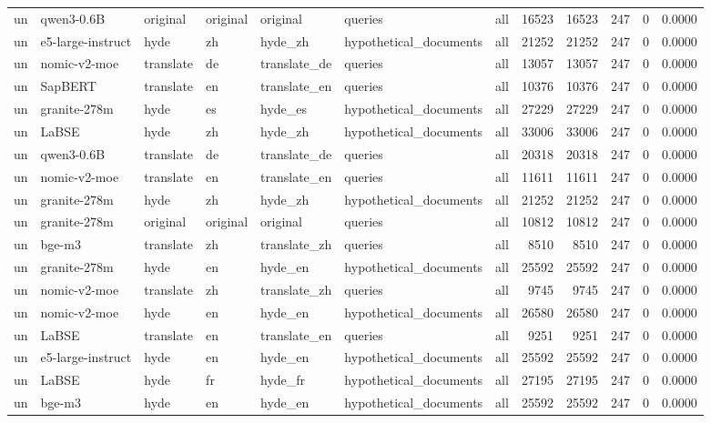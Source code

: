 \begin{tabular}{lllllllrrrrr}
un & qwen3-0.6B & original & original & original & queries & all & 16523 & 16523 & 247 & 0 & 0.0000 \\
un & e5-large-instruct & hyde & zh & hyde\_zh & hypothetical\_documents & all & 21252 & 21252 & 247 & 0 & 0.0000 \\
un & nomic-v2-moe & translate & de & translate\_de & queries & all & 13057 & 13057 & 247 & 0 & 0.0000 \\
un & SapBERT & translate & en & translate\_en & queries & all & 10376 & 10376 & 247 & 0 & 0.0000 \\
un & granite-278m & hyde & es & hyde\_es & hypothetical\_documents & all & 27229 & 27229 & 247 & 0 & 0.0000 \\
un & LaBSE & hyde & zh & hyde\_zh & hypothetical\_documents & all & 33006 & 33006 & 247 & 0 & 0.0000 \\
un & qwen3-0.6B & translate & de & translate\_de & queries & all & 20318 & 20318 & 247 & 0 & 0.0000 \\
un & nomic-v2-moe & translate & en & translate\_en & queries & all & 11611 & 11611 & 247 & 0 & 0.0000 \\
un & granite-278m & hyde & zh & hyde\_zh & hypothetical\_documents & all & 21252 & 21252 & 247 & 0 & 0.0000 \\
un & granite-278m & original & original & original & queries & all & 10812 & 10812 & 247 & 0 & 0.0000 \\
un & bge-m3 & translate & zh & translate\_zh & queries & all & 8510 & 8510 & 247 & 0 & 0.0000 \\
un & granite-278m & hyde & en & hyde\_en & hypothetical\_documents & all & 25592 & 25592 & 247 & 0 & 0.0000 \\
un & nomic-v2-moe & translate & zh & translate\_zh & queries & all & 9745 & 9745 & 247 & 0 & 0.0000 \\
un & nomic-v2-moe & hyde & en & hyde\_en & hypothetical\_documents & all & 26580 & 26580 & 247 & 0 & 0.0000 \\
un & LaBSE & translate & en & translate\_en & queries & all & 9251 & 9251 & 247 & 0 & 0.0000 \\
un & e5-large-instruct & hyde & en & hyde\_en & hypothetical\_documents & all & 25592 & 25592 & 247 & 0 & 0.0000 \\
un & LaBSE & hyde & fr & hyde\_fr & hypothetical\_documents & all & 27195 & 27195 & 247 & 0 & 0.0000 \\
un & bge-m3 & hyde & en & hyde\_en & hypothetical\_documents & all & 25592 & 25592 & 247 & 0 & 0.0000 \\

\end{tabular}

